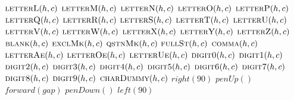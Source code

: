 \documentclass[a4paper,10pt]{article}
\begin{document}
\begin{algorithm}
\begin{algorithmic}[5]
        \State \(\Call{letterL}{h,c}\)
      \EndSelector
        \State \(\Call{letterM}{h,c}\)
      \EndSelector
        \State \(\Call{letterN}{h,c}\)
      \EndSelector
        \State \(\Call{letterO}{h,c}\)
      \EndSelector
        \State \(\Call{letterP}{h,c}\)
      \EndSelector
        \State \(\Call{letterQ}{h,c}\)
      \EndSelector
        \State \(\Call{letterR}{h,c}\)
      \EndSelector
        \State \(\Call{letterS}{h,c}\)
      \EndSelector
        \State \(\Call{letterT}{h,c}\)
      \EndSelector
        \State \(\Call{letterU}{h,c}\)
      \EndSelector
        \State \(\Call{letterV}{h,c}\)
      \EndSelector
        \State \(\Call{letterW}{h,c}\)
      \EndSelector
        \State \(\Call{letterX}{h,c}\)
      \EndSelector
        \State \(\Call{letterY}{h,c}\)
      \EndSelector
        \State \(\Call{letterZ}{h,c}\)
      \EndSelector
        \State \(\Call{blank}{h,c}\)
      \EndSelector
        \State \(\Call{exclMk}{h,c}\)
      \EndSelector
        \State \(\Call{qstnMk}{h,c}\)
      \EndSelector
        \State \(\Call{fullSt}{h,c}\)
      \EndSelector
        \State \(\Call{comma}{h,c}\)
      \EndSelector
        \State \(\Call{letterAe}{h,c}\)
      \EndSelector
        \State \(\Call{letterOe}{h,c}\)
      \EndSelector
        \State \(\Call{letterUe}{h,c}\)
      \EndSelector
        \State \(\Call{digit0}{h,c}\)
      \EndSelector
        \State \(\Call{digit1}{h,c}\)
      \EndSelector
        \State \(\Call{digit2}{h,c}\)
      \EndSelector
        \State \(\Call{digit3}{h,c}\)
      \EndSelector
        \State \(\Call{digit4}{h,c}\)
      \EndSelector
        \State \(\Call{digit5}{h,c}\)
      \EndSelector
        \State \(\Call{digit6}{h,c}\)
      \EndSelector
        \State \(\Call{digit7}{h,c}\)
      \EndSelector
        \State \(\Call{digit8}{h,c}\)
      \EndSelector
        \State \(\Call{digit9}{h,c}\)
      \EndSelector
      \Other
        \State \(\Call{charDummy}{h,c}\)
      \EndOther
    \EndCase
    \State \(right(90)\)
    \State \(penUp()\)
    \State \(forward(gap)\)
    \State \(penDown()\)
    \State \(left(90)\)
  \EndFor
\EndProcedure
\end{algorithmic}
\end{algorithm}
\end{document}
